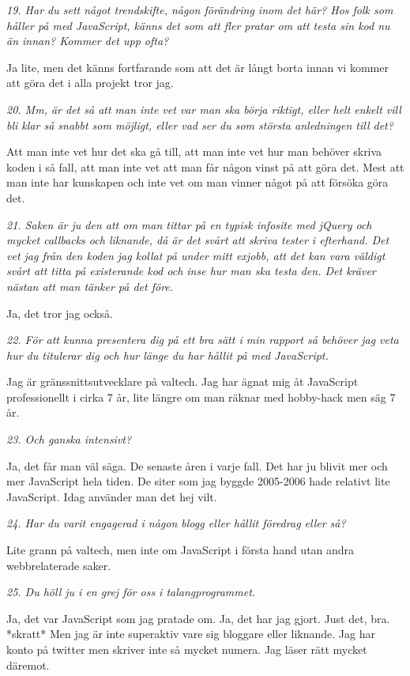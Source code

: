 \documentclass[11pt]{article}
\begin{document}
\emph{19. Har du sett något trendskifte, någon förändring inom det här? Hos folk som håller på med JavaScript, känns det som att fler pratar om att testa sin kod nu än innan? Kommer det upp ofta?}

Ja lite, men det känns fortfarande som att det är långt borta innan vi kommer att göra det i alla projekt tror jag.

\emph{20. Mm, är det så att man inte vet var man ska börja riktigt, eller helt enkelt vill bli klar så snabbt som möjligt, eller vad ser du som största anledningen till det?}

Att man inte vet hur det ska gå till, att man inte vet hur man behöver skriva koden i så fall, att man inte vet att man får någon vinst på att göra det. Mest att man inte har kunskapen och inte vet om man vinner något på att försöka göra det.

\emph{21. Saken är ju den att om man tittar på en typisk infosite med jQuery och mycket callbacks och liknande, då är det svårt att skriva tester i efterhand. Det vet jag från den koden jag kollat på under mitt exjobb, att det kan vara väldigt svårt att titta på existerande kod och inse hur man ska testa den. Det kräver nästan att man tänker på det före.}

Ja, det tror jag också.

\emph{22. För att kunna presentera dig på ett bra sätt i min rapport så behöver jag veta hur du titulerar dig och hur länge du har hållit på med JavaScript.}

Jag är gränssnittsutvecklare på valtech. Jag har ägnat mig åt JavaScript professionellt i cirka 7 år, lite längre om man räknar med hobby-hack men säg 7 år.

\emph{23. Och ganska intensivt?}

Ja, det får man väl säga. De senaste åren i varje fall. Det har ju blivit mer och mer JavaScript hela tiden. De siter som jag byggde 2005-2006 hade relativt lite JavaScript. Idag använder man det hej vilt.

\emph{24. Har du varit engagerad i någon blogg eller hållit föredrag eller så?}

Lite grann på valtech, men inte om JavaScript i första hand utan andra webbrelaterade saker.

\emph{25. Du höll ju i en grej för oss i talangprogrammet.}

Ja, det var JavaScript som jag pratade om. Ja, det har jag gjort. Just det, bra. *skratt* Men jag är inte superaktiv vare sig bloggare eller liknande. Jag har konto på twitter men skriver inte så mycket numera. Jag läser rätt mycket däremot.
\end{document}
